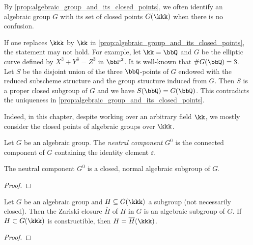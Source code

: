     \begin{remark}\label{rmk:algebraic_group_and_its_closed_points}
        By \cref{prop:algebraic_group_and_its_closed_points}, we often identify an algebraic group \(G\) with its set of closed points \(G(\kkk)\) when there is no confusion.
    \end{remark}

    \begin{remark}\label{rmk:closed_pointsd_and_k_points_of_algebraic_group}
        If one replaces \(\kkk\) by \(\kk\) in \cref{prop:algebraic_group_and_its_closed_points}, the statement may not hold.
        For example, let \(\kk = \bbQ\) and \(G\) be the elliptic curve defined by \(X^3 + Y^3 = Z^3\) in \(\bbP^2\).
        It is well-known that \(\# G(\bbQ) = 3\).
        Let \(S\) be the disjoint union of the three \(\bbQ\)-points of \(G\) endowed with the reduced subscheme structure and the group structure induced from \(G\).
        Then \(S\) is a proper closed subgroup of \(G\) and we have \(S(\bbQ) = G(\bbQ)\).
        This contradicts the uniqueness in \cref{prop:algebraic_group_and_its_closed_points}.

        Indeed, in this chapter, despite working over an arbitrary field \(\kk\), we mostly consider the closed points of algebraic groups over \(\kkk\).
    \end{remark}

    \begin{definition}\label{def:neutral_component}
        Let \(G\) be an algebraic group.
        The \emph{neutral component} \(G^0\) is the connected component of \(G\) containing the identity element \(\varepsilon\).
    \end{definition}

    \begin{proposition}\label{prop:neutral_component_is_subgroup}
        The neutral component \(G^0\) is a closed, normal algebraic subgroup of \(G\).
    \end{proposition}
    \begin{proof}
    \end{proof}

    \begin{proposition}\label{prop:closure_of_subgroup_is_subgroup}
        Let \(G\) be an algebraic group and \(H \subseteq G(\kkk)\) a subgroup (not necessarily closed).
        Then the Zariski closure \(\overline{H}\) of \(H\) in \(G\) is an algebraic subgroup of \(G\).
        If \(H \subset G(\kkk)\) is constructible, then \(H = \overline{H}(\kkk)\).
    \end{proposition}
    \begin{proof}
    \end{proof}

